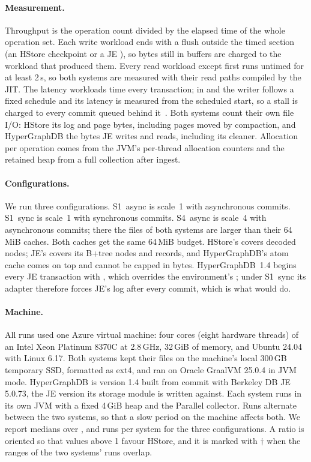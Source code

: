 \paragraph{Measurement.} Throughput is the operation count divided by the elapsed time of the whole operation set. Each write workload ends with a flush outside the timed section (an HStore checkpoint or a JE ), so bytes still in buffers are charged to the workload that produced them. Every read workload except  first runs untimed for at least 2\,s, so both systems are measured with their read paths compiled by the JIT. The latency workloads time every transaction; in  and  the writer follows a fixed schedule and its latency is measured from the scheduled start, so a stall is charged to every commit queued behind it~\cite{fair-benchmarking}. Both systems count their own file I/O: HStore its log and page bytes, including pages moved by compaction, and HyperGraphDB the bytes JE writes and reads, including its cleaner. Allocation per operation comes from the JVM's per-thread allocation counters and the retained heap from a full collection after ingest.

\paragraph{Configurations.} We run three configurations. S1~async is scale~1 with asynchronous commits. S1~sync is scale~1 with synchronous commits. S4~async is scale~4 with asynchronous commits; there the files of both systems are larger than their 64\,MiB caches. Both caches get the same 64\,MiB budget. HStore's covers decoded nodes; JE's covers its B+tree nodes and records, and HyperGraphDB's atom cache comes on top and cannot be capped in bytes. HyperGraphDB~1.4 begins every JE transaction with , which overrides the environment's ; under S1~sync its adapter therefore forces JE's log after every commit, which is what  would do.

\paragraph{Machine.} All runs used one Azure  virtual machine: four cores (eight hardware threads) of an Intel Xeon Platinum 8370C at 2.8\,GHz, 32\,GiB of memory, and Ubuntu 24.04 with Linux 6.17. Both systems kept their files on the machine's local 300\,GB temporary SSD, formatted as ext4, and ran on Oracle GraalVM 25.0.4 in JVM mode. HyperGraphDB is version 1.4 built from commit  with Berkeley DB JE 5.0.73, the JE version its storage module is written against. Each system runs in its own JVM with a fixed 4\,GiB heap and the Parallel collector. Runs alternate between the two systems, so that a slow period on the machine affects both. We report medians over ,  and  runs per system for the three configurations. A ratio is oriented so that values above 1 favour HStore, and it is marked with $\dagger$ when the ranges of the two systems' runs overlap.

